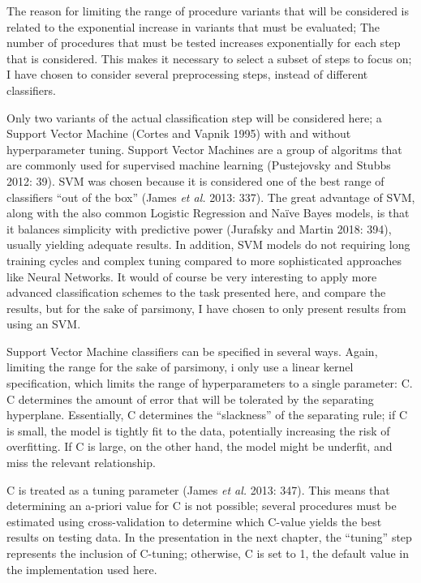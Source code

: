 \documentclass[12pt,twoside]{reedthesis}
\begin{document}
The reason for limiting the range of procedure variants that will be
considered is related to the exponential increase in variants that must
be evaluated; The number of procedures that must be tested increases
exponentially for each step that is considered. This makes it necessary
to select a subset of steps to focus on; I have chosen to consider
several preprocessing steps, instead of different classifiers.

Only two variants of the actual classification step will be considered
here; a Support Vector Machine (Cortes and Vapnik 1995) with and without
hyperparameter tuning. Support Vector Machines are a group of algoritms
that are commonly used for supervised machine learning (Pustejovsky and
Stubbs 2012: 39). SVM was chosen because it is considered one of the
best range of classifiers ``out of the box'' (James \emph{et al.} 2013:
337). The great advantage of SVM, along with the also common Logistic
Regression and Naïve Bayes models, is that it balances simplicity with
predictive power (Jurafsky and Martin 2018: 394), usually yielding
adequate results. In addition, SVM models do not requiring long training
cycles and complex tuning compared to more sophisticated approaches like
Neural Networks. It would of course be very interesting to apply more
advanced classification schemes to the task presented here, and compare
the results, but for the sake of parsimony, I have chosen to only
present results from using an SVM.

Support Vector Machine classifiers can be specified in several ways.
Again, limiting the range for the sake of parsimony, i only use a linear
kernel specification, which limits the range of hyperparameters to a
single parameter: C. C determines the amount of error that will be
tolerated by the separating hyperplane. Essentially, C determines the
``slackness'' of the separating rule; if C is small, the model is
tightly fit to the data, potentially increasing the risk of overfitting.
If C is large, on the other hand, the model might be underfit, and miss
the relevant relationship.

C is treated as a tuning parameter (James \emph{et al.} 2013: 347). This
means that determining an a-priori value for C is not possible; several
procedures must be estimated using cross-validation to determine which
C-value yields the best results on testing data. In the presentation in
the next chapter, the ``tuning'' step represents the inclusion of
C-tuning; otherwise, C is set to 1, the default value in the
implementation used here.
\end{document}
